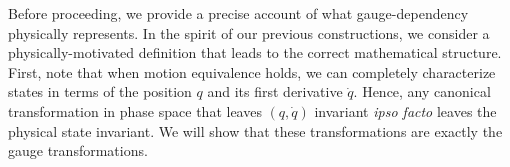 \documentclass[letterpaper]{article}
\begin{document}
Before proceeding, we provide a precise account of what gauge-dependency physically represents. In the spirit of our previous constructions, we consider a physically-motivated definition that leads to the correct mathematical structure. First, note that when motion equivalence holds, we can completely characterize states in terms of the position $q$ and its first derivative $\dot{q}$. Hence, any canonical transformation in phase space that leaves $(q,\dot{q}) $ invariant \textit{ipso facto} leaves the physical state invariant. We will show that these transformations are exactly the gauge transformations.

\end{document}

